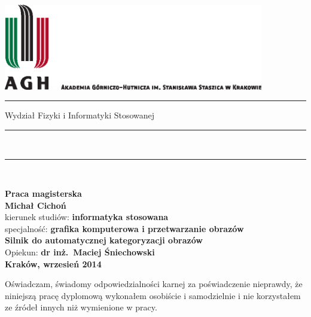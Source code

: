 \documentclass[a4paper,12pt]{book}
\begin{document}
\nocite{*}


\thispagestyle{empty}
\includegraphics[height=37.5mm]{agh_nzw_a_pl_1w_wbr_cmyk.eps}\\
\rule{30mm}{0pt}
{\large \textsf{Wydział Fizyki i Informatyki Stosowanej}}\\
\rule{\textwidth}{3pt}\\
\rule[2ex]
{\textwidth}{1pt}\\
\vspace{7ex}
\begin{center}
{\LARGE \bf \textsf{Praca magisterska}}\\
\vspace{13ex}
{\bf \Large \textsf{Michał Cichoń}}\\
\vspace{3ex}
{\sf\small kierunek studiów:} {\bf\small \textsf{informatyka stosowana}}\\
\vspace{1.5ex}
{\sf\small specjalność:} {\bf\small \textsf{grafika komputerowa i przetwarzanie obrazów}}\\
\vspace{10ex}
{\bf \huge \textsf{Silnik do automatycznej kategoryzacji obrazów}}\\
\vspace{14ex}
{\Large Opiekun: \bf \textsf{dr inż.\ Maciej Śniechowski}}\\
\vspace{22ex}
{\large \bf \textsf{Kraków, wrzesień 2014}}
\end{center}

\newpage

{\sf Oświadczam, świadomy odpowiedzialności karnej za poświadczenie nieprawdy, że niniejszą pracę dyplomową wykonałem osobiście i samodzielnie i  nie korzystałem ze źródeł innych niż wymienione w pracy.}
\end{document}
